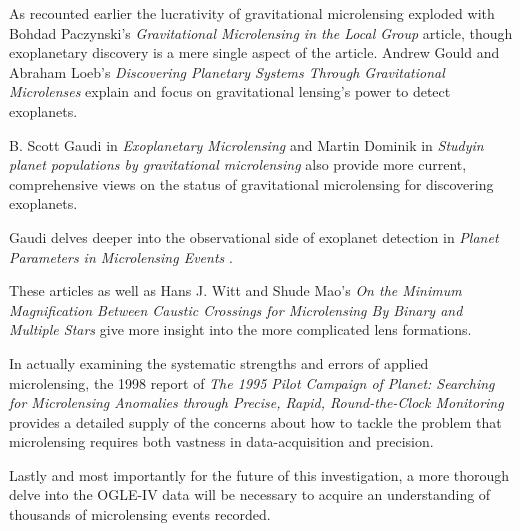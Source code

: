 \documentclass[12pt, a4paper, twocolumn]{article}
\begin{document}
As recounted earlier the lucrativity of gravitational microlensing exploded with Bohdad Paczynski's \emph{Gravitational Microlensing in the Local Group} \cite{paczynski} article, though exoplanetary discovery is a mere single aspect of the article.
Andrew Gould and Abraham Loeb's \emph{Discovering Planetary Systems Through Gravitational Microlenses} \cite{gould_discovering} explain and focus on gravitational lensing's power to detect exoplanets.

B. Scott Gaudi in \emph{Exoplanetary Microlensing} \cite{gaudi} and Martin Dominik in \emph{Studyin planet populations by gravitational microlensing} also provide more current, comprehensive views on the status of gravitational microlensing for discovering exoplanets.

Gaudi delves deeper into the observational side of exoplanet detection in \emph{Planet Parameters in Microlensing Events} \cite{gaudi_parameters}.


These articles as well as Hans J. Witt and Shude Mao's \emph{On the Minimum Magnification Between Caustic Crossings for Microlensing By Binary and Multiple Stars} \cite{witt_mag} give more insight into the more complicated lens formations.

In actually examining the systematic strengths and errors of applied microlensing, the 1998 report of \emph{The 1995 Pilot Campaign of Planet: Searching for Microlensing Anomalies through Precise, Rapid, Round-the-Clock Monitoring} \cite{PLANET} provides a detailed supply of the concerns about how to tackle the problem that microlensing requires both vastness in data-acquisition and precision.

Lastly and most importantly for the future of this investigation, a more thorough delve into the OGLE-IV data \cite{ogle}  will be necessary to acquire an understanding of thousands of microlensing events recorded.




\end{document}
